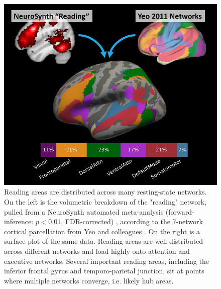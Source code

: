 \begin{figure}
\centering
\includegraphics[width=5in]{images/ch1-yeo-to-neurosynth.png}
    \caption[Reading areas are distributed across many resting-state networks.]{Reading areas are distributed across many resting-state networks. On the left is the volumetric breakdown of the "reading" network, pulled from a NeuroSynth automated meta-analysis (forward-inference: $p < 0.01$, FDR-corrected) \cite{Yarkoni2011}, according to the 7-network cortical parcellation from Yeo and colleagues \cite{Yeo2011}. On the right is a surface plot of the same data. Reading areas are well-distributed across different networks and load highly onto attention and executive networks. Several important reading areas, including the inferior frontal gyrus and temporo-parietal junction, sit at points where multiple networks converge, i.e. likely hub areas.}
    \label{fig:texlogo}
\end{figure}


